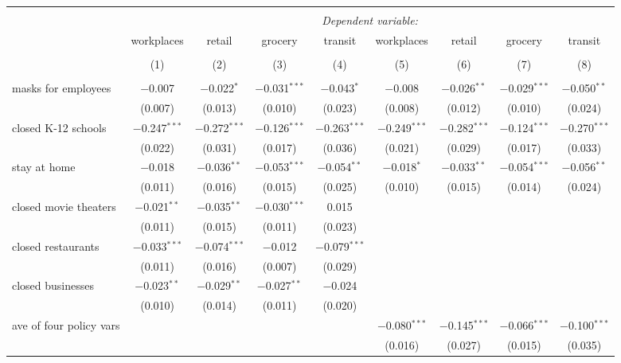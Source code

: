 \begin{tabular}{@{\extracolsep{1pt}}lcccccccc} 
\\[-1.8ex]\hline 
\hline \\[-1.8ex] 
 & \multicolumn{8}{c}{\textit{Dependent variable:}} \\ 
\cline{2-9} 
 & workplaces & retail & grocery & transit & workplaces & retail & grocery & transit \\ 
\\[-1.8ex] & (1) & (2) & (3) & (4) & (5) & (6) & (7) & (8)\\ 
\hline \\[-1.8ex] 
 masks for employees & $-$0.007 & $-$0.022$^{*}$ & $-$0.031$^{***}$ & $-$0.043$^{*}$ & $-$0.008 & $-$0.026$^{**}$ & $-$0.029$^{***}$ & $-$0.050$^{**}$ \\ 
  & (0.007) & (0.013) & (0.010) & (0.023) & (0.008) & (0.012) & (0.010) & (0.024) \\ 
  closed K-12 schools & $-$0.247$^{***}$ & $-$0.272$^{***}$ & $-$0.126$^{***}$ & $-$0.263$^{***}$ & $-$0.249$^{***}$ & $-$0.282$^{***}$ & $-$0.124$^{***}$ & $-$0.270$^{***}$ \\ 
  & (0.022) & (0.031) & (0.017) & (0.036) & (0.021) & (0.029) & (0.017) & (0.033) \\ 
  stay at home & $-$0.018 & $-$0.036$^{**}$ & $-$0.053$^{***}$ & $-$0.054$^{**}$ & $-$0.018$^{*}$ & $-$0.033$^{**}$ & $-$0.054$^{***}$ & $-$0.056$^{**}$ \\ 
  & (0.011) & (0.016) & (0.015) & (0.025) & (0.010) & (0.015) & (0.014) & (0.024) \\ 
  closed movie theaters & $-$0.021$^{**}$ & $-$0.035$^{**}$ & $-$0.030$^{***}$ & 0.015 &  &  &  &  \\ 
  & (0.011) & (0.015) & (0.011) & (0.023) &  &  &  &  \\ 
  closed restaurants & $-$0.033$^{***}$ & $-$0.074$^{***}$ & $-$0.012 & $-$0.079$^{***}$ &  &  &  &  \\ 
  & (0.011) & (0.016) & (0.007) & (0.029) &  &  &  &  \\ 
  closed businesses & $-$0.023$^{**}$ & $-$0.029$^{**}$ & $-$0.027$^{**}$ & $-$0.024 &  &  &  &  \\ 
  & (0.010) & (0.014) & (0.011) & (0.020) &  &  &  &  \\ 
  ave of four policy vars &  &  &  &  & $-$0.080$^{***}$ & $-$0.145$^{***}$ & $-$0.066$^{***}$ & $-$0.100$^{***}$ \\ 
  &  &  &  &  & (0.016) & (0.027) & (0.015) & (0.035) \\ 

\end{tabular}
